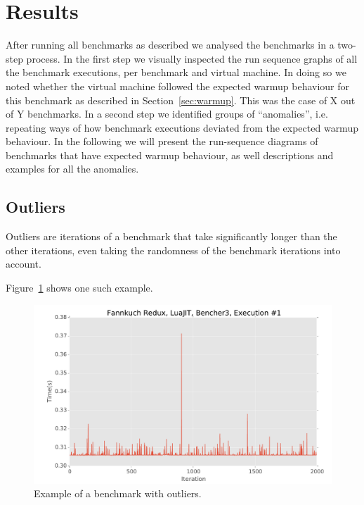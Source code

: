 \documentclass[10pt,preprint]{sigplanconf}
\begin{document}
\section{Results}
\label{sec:Results}

After running all benchmarks as described we analysed the benchmarks in a
two-step process. In the first step we visually inspected the run sequence
graphs of all the benchmark executions, per benchmark and virtual machine. In
doing so we noted whether the virtual machine followed the expected warmup
behaviour for this benchmark as described in Section~\ref{sec:warmup}. This was
the case of  X out of Y benchmarks. In a second step we
identified groups of ``anomalies'', i.e. repeating ways of how benchmark
executions deviated from the expected warmup behaviour. In the following we will
present the run-sequence diagrams of benchmarks that have expected warmup
behaviour, as well descriptions and examples for all the anomalies.







\subsection{Outliers}
\label{sub:outliers}

Outliers are iterations of a benchmark that take significantly longer than the
other iterations, even taking the randomness of the benchmark iterations into
account.

Figure~\ref{fig:examples:outliers1} shows one such example.

\begin{figure}[h!]
\centering
\includegraphics[width=.46\textwidth]{examples/outliers1}
\caption{Example of a benchmark with outliers.}
\label{fig:examples:outliers1}
\end{figure}
\end{document}
